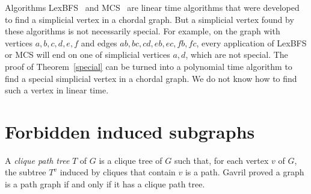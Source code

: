 \documentclass[11pt]{article}
\begin{document}
Algorithms LexBFS~\cite{RTL76} and MCS~\cite{TY84} are linear time
algorithms that were developed to find a simplicial vertex in a
chordal graph.  But a simplicial vertex found by these algorithms is
not necessarily special.  For example, on the graph with vertices
$a,b,c,d,e,f$ and edges $ab,bc, cd, eb, ec, fb, fc$, every application
of LexBFS or MCS will end on one of simplicial vertices $a, d$, which
are not special.  The proof of Theorem~\ref{special} can be turned
into a polynomial time algorithm to find a special simplicial vertex
in a chordal graph.  We do not know how to find such a vertex in
linear time.

\section{Forbidden induced subgraphs}

A \emph{clique path tree} $T$ of $G$ is a clique tree of $G$ such
that, for each vertex $v$ of $G$, the subtree $T^v$ induced by cliques
that contain $v$ is a path.  Gavril \cite{Gav78} proved a graph is a
path graph if and only if it has a clique path tree.
\end{document}
